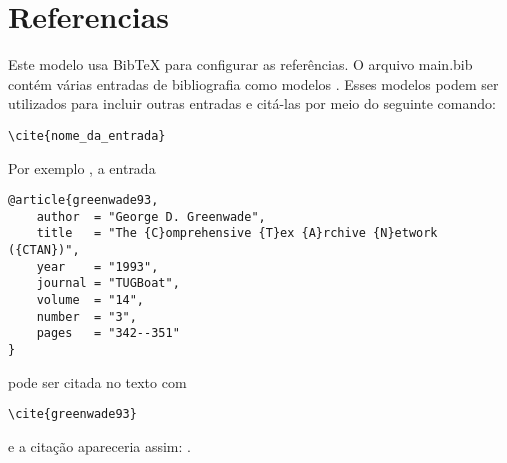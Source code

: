 \chapter{Referencias}

\thispagestyle{empty} 

Este modelo usa BibTeX para configurar as referências. O arquivo main.bib contém várias entradas de bibliografia como modelos \cite{article,book,booklet,inbook}. Esses modelos podem ser utilizados para incluir outras entradas e citá-las por meio do seguinte comando:
\begin{verbatim}
\cite{nome_da_entrada}
\end{verbatim}

Por exemplo , a entrada
\verbatimfont{\small}
\begin{verbatim}
@article{greenwade93,
    author  = "George D. Greenwade",
    title   = "The {C}omprehensive {T}ex {A}rchive {N}etwork ({CTAN})",
    year    = "1993",
    journal = "TUGBoat",
    volume  = "14",
    number  = "3",
    pages   = "342--351"
}
\end{verbatim}
\verbatimfont{\normalfont}
pode ser citada no texto com
\begin{verbatim}
\cite{greenwade93}
\end{verbatim}
e a citação apareceria assim: \cite{greenwade93}.

